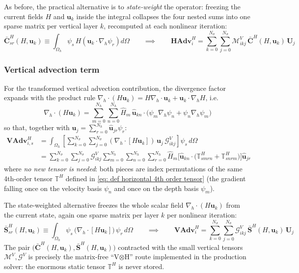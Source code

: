 \documentclass{article}
\newcommand{\Ns}{N_\sigma}
\newcommand{\uj}{\mathbf{u}_j}
\newcommand{\uk}{\mathbf{u}_k}
\newcommand{\sumj}{\sum_{j=0}^{\Ns}}
\newcommand{\sumk}{\sum_{k=0}^{\Ns}}
\newcommand{\nablah}{\nabla_h}
\newcommand{\VMikj}{\boldsymbol{\mathcal{M}}_{ikj}^V}
\newcommand{\VGikj}{\boldsymbol{\mathcal{G}}_{ikj}^V}
\newcommand{\VtM}{\boldsymbol{\mathcal{M}}^V}
\newcommand{\VtG}{\boldsymbol{\mathcal{G}}^V}
\newcommand{\Nh}{N_h}
\newcommand{\sumNhr}{\sum_{r=0}^{\Nh}}
\newcommand{\sumNhn}{\sum_{n=0}^{\Nh}}
\newcommand{\sumNhm}{\sum_{m=0}^{\Nh}}
\newcommand{\uhkn}{\hat{\mathbf{u}}_{kn}}
\newcommand{\uhjr}{\hat{\mathbf{u}}_{jr}}
\newcommand{\Hm}{\hat{H}_m}
\begin{document}
As before, the practical alternative is to \emph{state-weight} the operator: freezing the current fields $H$ and $\uk$ inside the integral collapses the four nested sums into one sparse matrix per vertical layer $k$, recomputed at each nonlinear iteration:
\begin{equation}
    \boxed{\bar{\mathbf{C}}^H_{sr}(H,\uk) \equiv \int_{\Omega_h} \psi_s \, H \left(\uk\cdot\nablah\psi_r\right) d\Omega}
    \qquad\implies\qquad
    \mathbf{HAdv}_{i}^H = \sumk\sumj \VMikj \, \bar{\mathbf{C}}^H(H,\uk)\, \mathbf{U}_j
    \label{eq: def state weighted advection operator}
\end{equation}

\subsubsection*{Vertical advection term}

For the transformed vertical advection contribution, the divergence factor expands with the product rule $\nablah\cdot(H\uk) = H\nablah\cdot\uk + \uk\cdot\nablah H$, i.e.
$$\nablah\cdot(H\uk) = \sumNhm\sumNhn \Hm \, \uhkn\cdot\big( \psi_m\nablah\psi_n + \psi_n\nablah\psi_m \big)$$
so that, together with $\uj = \sumNhr \uhjr\psi_r$:
\begin{align*}
    \mathbf{VAdv}_{i,s}^H &= \int_{\Omega_h}\left[\sumk\sumj(\nablah\cdot[H\uk])\,\uj\,\VGikj\right]\psi_s\,d\Omega \\
    &= \sumk\sumj \VGikj \sumNhm\sumNhn\sumNhr \Hm \Big[\uhkn\cdot\big(\mathbb{T}^H_{smrn} + \mathbb{T}^H_{snrm}\big)\Big] \uhjr
\end{align*}
where \emph{no new tensor is needed}: both pieces are index permutations of the same 4th-order tensor $\mathbb{T}^H$ defined in \eqref{eq: def horizontal 4th order tensor} (the gradient falling once on the velocity basis $\psi_n$ and once on the depth basis $\psi_m$).

The state-weighted alternative freezes the whole scalar field $\nablah\cdot(H\uk)$ from the current state, again one sparse matrix per layer $k$ per nonlinear iteration:
\begin{equation}
    \boxed{\bar{\mathbf{S}}^H_{sr}(H,\uk) \equiv \int_{\Omega_h} \psi_s \, \big(\nablah\cdot[H\uk]\big)\,\psi_r \, d\Omega}
    \qquad\implies\qquad
    \mathbf{VAdv}_{i}^H = \sumk\sumj \VGikj \, \bar{\mathbf{S}}^H(H,\uk)\, \mathbf{U}_j
    \label{eq: def state weighted vertical advection operator}
\end{equation}
The pair $\big(\bar{\mathbf{C}}^H(H,\uk), \bar{\mathbf{S}}^H(H,\uk)\big)$ contracted with the small vertical tensors $\VtM,\VtG$ is precisely the matrix-free ``V$\otimes$H'' route implemented in the production solver: the enormous static tensor $\mathbb{T}^H$ is never stored.
 
\end{document}
